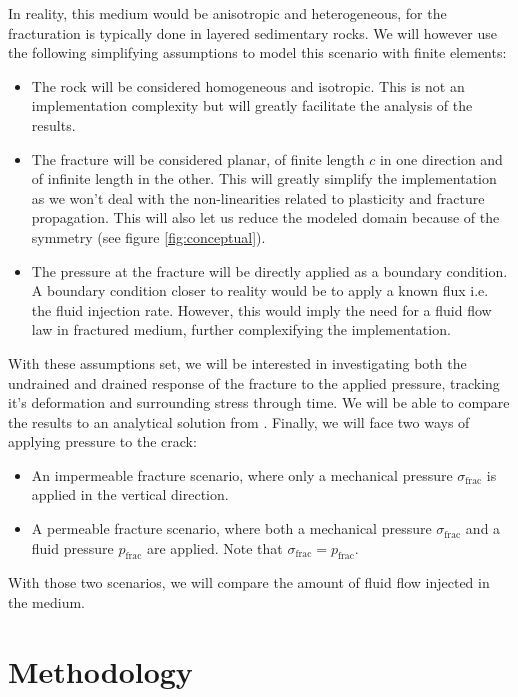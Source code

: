 \documentclass{article}
\begin{document}
In reality, this medium would be anisotropic and heterogeneous, for the fracturation is typically done in layered sedimentary rocks. We will however use the following simplifying assumptions to model this scenario with finite elements:

\begin{itemize}
	\item The rock will be considered homogeneous and isotropic. This is not an implementation complexity but will greatly facilitate the analysis of the results.
	\item The fracture will be considered planar, of finite length $c$ in one direction and of infinite length in the other. This will greatly simplify the implementation as we won't deal with the non-linearities related to plasticity and fracture propagation. This will also let us reduce the modeled domain because of the symmetry (see figure \ref{fig:conceptual}).
	\item The pressure at the fracture will be directly applied as a boundary condition. A boundary condition closer to reality would be to apply a known flux i.e. the fluid injection rate. However, this would imply the need for a fluid flow law in fractured medium, further complexifying the implementation.
\end{itemize}
%
With these assumptions set, we will be interested in investigating both the undrained and drained response of the fracture to the applied pressure, tracking it's deformation and surrounding stress through time. We will be able to compare the results to an analytical solution from . Finally, we will face two ways of applying pressure to the crack:


\begin{itemize}
	\item An impermeable fracture scenario, where only a mechanical pressure $\sigma_{\text{frac}}$ is applied in the vertical direction.
	\item A permeable fracture scenario, where both a mechanical pressure $\sigma_{\text{frac}}$ and a fluid pressure $p_{\text{frac}}$ are applied. Note that $\sigma_{\text{frac}} = p_{\text{frac}}$.
\end{itemize}
%
With those two scenarios, we will compare the amount of fluid flow injected in the medium.

\section{Methodology}
\end{document}
